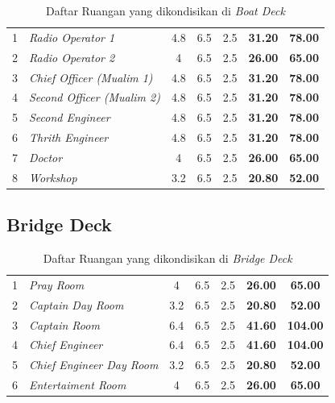 \documentclass[12pt,a4paper,twoside,openright]{book}
\theoremstyle{definition}
\theoremstyle{plain}
\theoremstyle{remark}
\begin{document}
\begin{table}[H]
\centering
\caption{Daftar Ruangan yang dikondisikan di \textit{Boat Deck}}
\footnotesize
\begin{tabularx}{\textwidth}{|c|X|c|c|c|c|c|}
\hline
\rowcolor{tableheader}
\multicolumn{2}{|c|}{\textbf{Boat Deck}} & & & & & \\
\hline
1 & \textit{Radio Operator 1} & 4.8 & 6.5 & 2.5 & \textbf{31.20} & \textbf{78.00} \\
\hline
2 & \textit{Radio Operator 2} & 4 & 6.5 & 2.5 & \textbf{26.00} & \textbf{65.00} \\
\hline
3 & \textit{Chief Officer (Mualim 1)} & 4.8 & 6.5 & 2.5 & \textbf{31.20} & \textbf{78.00} \\
\hline
4 & \textit{Second Officer (Mualim 2)} & 4.8 & 6.5 & 2.5 & \textbf{31.20} & \textbf{78.00} \\
\hline
5 & \textit{Second Engineer} & 4.8 & 6.5 & 2.5 & \textbf{31.20} & \textbf{78.00} \\
\hline
6 & \textit{Thrith Engineer} & 4.8 & 6.5 & 2.5 & \textbf{31.20} & \textbf{78.00} \\
\hline
7 & \textit{Doctor} & 4 & 6.5 & 2.5 & \textbf{26.00} & \textbf{65.00} \\
\hline
8 & \textit{Workshop} & 3.2 & 6.5 & 2.5 & \textbf{20.80} & \textbf{52.00} \\
\hline
\end{tabularx}
\end{table}

\subsection*{Bridge Deck}

\begin{table}[H]
\centering
\caption{Daftar Ruangan yang dikondisikan di \textit{Bridge Deck}}
\footnotesize
\begin{tabularx}{\textwidth}{|c|X|c|c|c|c|c|}
\hline
\rowcolor{tableheader}
\multicolumn{2}{|c|}{\textbf{Bridge Deck}} & & & & & \\
\hline
1 & \textit{Pray Room} & 4 & 6.5 & 2.5 & \textbf{26.00} & \textbf{65.00} \\
\hline
2 & \textit{Captain Day Room} & 3.2 & 6.5 & 2.5 & \textbf{20.80} & \textbf{52.00} \\
\hline
3 & \textit{Captain Room} & 6.4 & 6.5 & 2.5 & \textbf{41.60} & \textbf{104.00} \\
\hline
4 & \textit{Chief Engineer} & 6.4 & 6.5 & 2.5 & \textbf{41.60} & \textbf{104.00} \\
\hline
5 & \textit{Chief Engineer Day Room} & 3.2 & 6.5 & 2.5 & \textbf{20.80} & \textbf{52.00} \\
\hline
6 & \textit{Entertaiment Room} & 4 & 6.5 & 2.5 & \textbf{26.00} & \textbf{65.00} \\
\hline
\end{tabularx}
\end{table}
\end{document}
